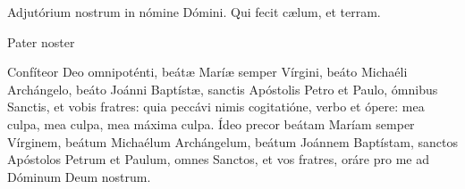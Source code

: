 \documentclass[a4paper, twoside, 12pt]{article}
\begin{document}
\pagebreak


\trOrationis

\vspace{1cm}
\vspace{2mm}





\vfill
\pagebreak




\vfill



\vfill

 


\trComplLectioBr

\vfill

\noindent \Vbardot{} Adjutórium nostrum in nómine Dómini. \Rbardot{} Qui fecit cælum, et terram.

\vfill

\noindent Pater noster 

\vfill
\pagebreak


\noindent Confíteor Deo omnipoténti, beátæ Maríæ semper Vírgini, beáto
Michaéli Archángelo, beáto Joánni Baptístæ, sanctis Apóstolis Petro
et Paulo, ómnibus Sanctis, et vobis fratres: quia peccávi nimis cogitatióne,
verbo et ópere: mea culpa, mea culpa, mea máxima culpa.
Ídeo precor beátam Maríam semper Vírginem, beátum Michaélum
Archángelum, beátum Joánnem Baptístam, sanctos Apóstolos Petrum
et Paulum, omnes Sanctos, et vos fratres, oráre pro me ad Dóminum
Deum nostrum.
\end{document}
